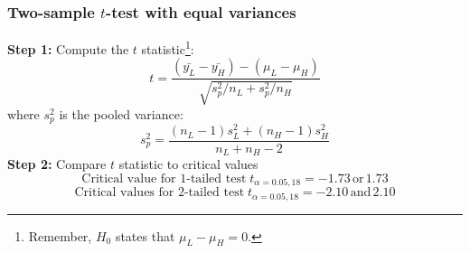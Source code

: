 \documentclass[color=usenames,dvipsnames]{beamer}\usepackage[]{graphicx}\usepackage[]{color}
\makeatletter
\def\maxwidth{ %
  \ifdim\Gin@nat@width>\linewidth
    \linewidth
  \else
    \Gin@nat@width
  \fi
}
\newenvironment{knitrout}{}{} %
\makeatother
\begin{document}
\begin{comment}
\begin{frame}[fragile]
  \frametitle{Example}
  \vspace{-0.5cm}
\begin{center}
\begin{knitrout}
\definecolor{shadecolor}{rgb}{0.878, 0.918, 0.933}\color{fgcolor}
\texttt{[image: figure/popsamp-1]} 

\end{knitrout}
\end{center}
\end{frame}
\end{comment}




\begin{frame}[fragile]
  \frametitle{Two-sample $t$-test with equal variances}
  {\bf Step 1:} Compute the $t$ statistic\footnote{\scriptsize Remember, $H_0$ states that $\mu_L-\mu_H =0$.}:
  \[
  t = \frac{(\bar{y_L} - \bar{y_H}) - (\mu_L - \mu_H)}{
    \sqrt{s^2_p/n_L + s^2_p/n_H}}
  \]
  where $s^2_p$ is the pooled variance:
  \[
  s^2_p = \frac{(n_L-1)s^2_L + (n_H-1)s^2_H}{n_L + n_H - 2}
  \]
  \pause
  {\bf Step 2:} Compare $t$ statistic to critical values
  \[
     \mbox{Critical value for 1-tailed test}\; t_{\alpha=0.05,18}= -1.73\, \mathrm{or}\, 1.73
  \]
  \[
     \mbox{Critical values for 2-tailed test}\; t_{\alpha=0.05,18}= -2.10\, \mathrm{and}\, 2.10
  \]
\end{frame}





\end{document}
